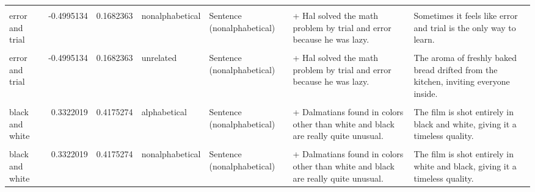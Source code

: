 \documentclass[
  12pt,
]{scrartcl}
\begin{document}
\begin{landscape}
\begin{longtable}{lrrllll}
\cellcolor{gray!6}{error and trial} & \cellcolor{gray!6}{-0.4995134} & \cellcolor{gray!6}{0.1682363} & \cellcolor{gray!6}{nonalphabetical} & \cellcolor{gray!6}{Sentence (alphabetical)} & \cellcolor{gray!6}{+ Hal solved the math problem by error and trial because he was lazy.} & \cellcolor{gray!6}{Sometimes it feels like error and trial is the only way to learn.}\\
error and trial & -0.4995134 & 0.1682363 & nonalphabetical & Sentence (nonalphabetical) & + Hal solved the math problem by trial and error because he was lazy. & Sometimes it feels like error and trial is the only way to learn.\\
\cellcolor{gray!6}{error and trial} & \cellcolor{gray!6}{-0.4995134} & \cellcolor{gray!6}{0.1682363} & \cellcolor{gray!6}{unrelated} & \cellcolor{gray!6}{Sentence (alphabetical)} & \cellcolor{gray!6}{+ Hal solved the math problem by error and trial because he was lazy.} & \cellcolor{gray!6}{The aroma of freshly baked bread drifted from the kitchen, inviting everyone inside.}\\
error and trial & -0.4995134 & 0.1682363 & unrelated & Sentence (nonalphabetical) & + Hal solved the math problem by trial and error because he was lazy. & The aroma of freshly baked bread drifted from the kitchen, inviting everyone inside.\\
\addlinespace
\cellcolor{gray!6}{black and white} & \cellcolor{gray!6}{0.3322019} & \cellcolor{gray!6}{0.4175274} & \cellcolor{gray!6}{alphabetical} & \cellcolor{gray!6}{Sentence (alphabetical)} & \cellcolor{gray!6}{+ Dalmatians found in colors other than black and white are really quite unusual.} & \cellcolor{gray!6}{The film is shot entirely in black and white, giving it a timeless quality.}\\
black and white & 0.3322019 & 0.4175274 & alphabetical & Sentence (nonalphabetical) & + Dalmatians found in colors other than white and black are really quite unusual. & The film is shot entirely in black and white, giving it a timeless quality.\\
\cellcolor{gray!6}{black and white} & \cellcolor{gray!6}{0.3322019} & \cellcolor{gray!6}{0.4175274} & \cellcolor{gray!6}{nonalphabetical} & \cellcolor{gray!6}{Sentence (alphabetical)} & \cellcolor{gray!6}{+ Dalmatians found in colors other than black and white are really quite unusual.} & \cellcolor{gray!6}{The film is shot entirely in white and black, giving it a timeless quality.}\\
black and white & 0.3322019 & 0.4175274 & nonalphabetical & Sentence (nonalphabetical) & + Dalmatians found in colors other than white and black are really quite unusual. & The film is shot entirely in white and black, giving it a timeless quality.\\

\end{longtable}
\end{landscape}
\end{document}
